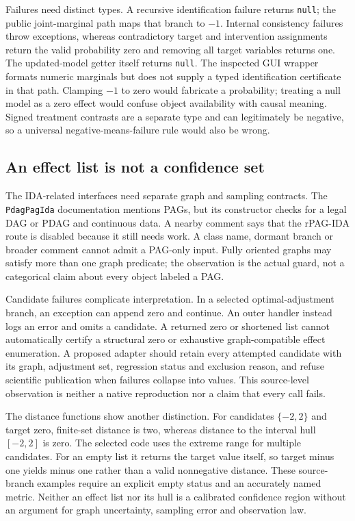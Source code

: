Failures need distinct types. A recursive identification failure returns
\texttt{null}; the public joint-marginal path maps that branch to $-1$.
Internal consistency failures throw exceptions, whereas contradictory target
and intervention assignments return the valid probability zero and removing
all target variables returns one. The updated-model getter itself returns
\texttt{null}. The inspected GUI wrapper formats numeric marginals but does
not supply a typed identification certificate in that path. Clamping $-1$ to
zero would fabricate a probability; treating a null model as a zero effect
would confuse object availability with causal meaning. Signed treatment
contrasts are a separate type and can legitimately be negative, so a universal
negative-means-failure rule would also be wrong.\citep{exec19_javaid_source}

\subsection{An effect list is not a confidence set}
\label{exec19:javaid-candidates}

The IDA-related interfaces need separate graph and sampling contracts.
The \texttt{PdagPagIda} documentation mentions PAGs, but its constructor checks
for a legal DAG or PDAG and continuous data. A nearby comment says that the
rPAG-IDA route is disabled because it still needs work. A class name, dormant
branch or broader comment cannot admit a PAG-only input. Fully oriented graphs
may satisfy more than one graph predicate; the observation is the actual guard,
not a categorical claim about every object labeled a PAG.
\citep{exec19_javaid_source}

Candidate failures complicate interpretation. In a selected optimal-adjustment
branch, an exception can append zero and continue. An outer handler instead
logs an error and omits a candidate. A returned zero or shortened list cannot
automatically certify a structural zero or exhaustive graph-compatible effect
enumeration. A proposed adapter should retain every attempted candidate with
its graph, adjustment set, regression status and exclusion reason, and refuse
scientific publication when failures collapse into values. This source-level
observation is neither a native reproduction nor a claim that every call fails.
\citep{exec19_javaid_source}

The distance functions show another distinction. For candidates $\{-2,2\}$
and target zero, finite-set distance is two, whereas distance to the interval
hull $[-2,2]$ is zero. The selected code uses the extreme range for multiple
candidates. For an empty list it returns the target value itself, so target
minus one yields minus one rather than a valid nonnegative distance. These
source-branch examples require an explicit empty status and an accurately named
metric. Neither an effect list nor its hull is a calibrated confidence region
without an argument for graph uncertainty, sampling error and observation law.
\citep{exec19_javaid_source,exec19_javaid_reference}

